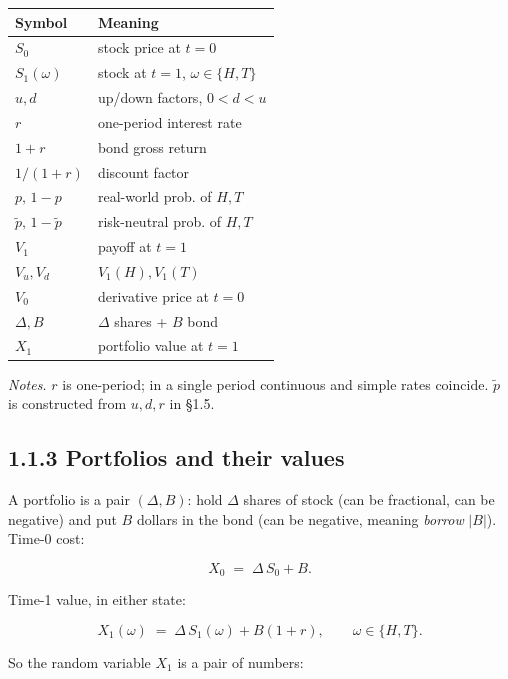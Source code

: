 \documentclass[
  10pt,
  twoside]{book}
\newcounter{none} %
\begin{document}
{\def\LTcaptype{none} %
\begin{table}[H]
\centering
\begin{tabular}{|l|l|}
\toprule
Symbol & Meaning \\
\midrule



\(S_0\) & stock price at \(t=0\) \\
\(S_1(\omega)\) & stock at \(t=1\), \(\omega\in\{H,T\}\) \\
\(u,d\) & up/down factors, \(0<d<u\) \\
\(r\) & one-period interest rate \\
\(1+r\) & bond gross return \\
\(1/(1+r)\) & discount factor \\
\(p,\,1-p\) & real-world prob. of \(H,T\) \\
\(\tilde p,\,1-\tilde p\) & risk-neutral prob. of \(H,T\) \\
\(V_1\) & payoff at \(t=1\) \\
\(V_u,V_d\) & \(V_1(H),V_1(T)\) \\
\(V_0\) & derivative price at \(t=0\) \\
\(\Delta,B\) & \(\Delta\) shares + \(B\) bond \\
\(X_1\) & portfolio value at \(t=1\) \\
\bottomrule
\end{tabular}
\end{table}
}

\emph{Notes.} \(r\) is one-period; in a single period continuous and
simple rates coincide. \(\tilde p\) is constructed from \(u,d,r\) in
§1.5.

\subsection{1.1.3 Portfolios and their
values}\label{portfolios-and-their-values}

A portfolio is a pair \((\Delta,B)\): hold \(\Delta\) shares of stock
(can be fractional, can be negative) and put \(B\) dollars in the bond
(can be negative, meaning \emph{borrow} \(|B|\)). Time-0 cost:

\[X_0 \;=\; \Delta\, S_0 + B.\]

Time-1 value, in either state:

\[X_1(\omega) \;=\; \Delta\, S_1(\omega) + B(1+r),\qquad \omega\in\{H,T\}.\]

So the random variable \(X_1\) is a pair of numbers:
\end{document}
